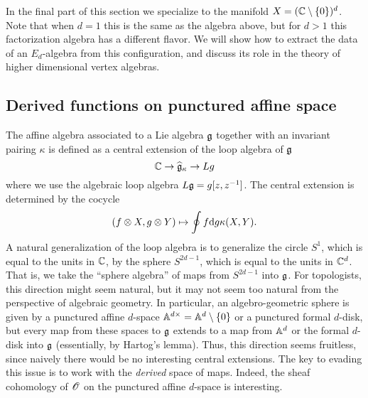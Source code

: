 \documentclass[10pt]{amsart}
\begin{document}
In the final part of this section we specialize to the manifold $X = (\CC \setminus \{0\})^d$. 
Note that when $d=1$ this is the same as the algebra above, but for $d>1$ this factorization algebra has a different flavor. 
We will show how to extract the data of an $E_d$-algebra from this configuration, and discuss its role in the theory of higher dimensional vertex algebras. 



\subsection{Derived functions on punctured affine space}

The affine algebra associated to a Lie algebra $\fg$ together with an invariant pairing $\kappa$ is defined as a central extension of the loop algebra of $\fg$
\[
\CC \to \Hat{\fg}_{\kappa} \to Lg 
\]
where we use the algebraic loop algebra $L\fg = g [z,z^{-1}]$.
The central extension is determined by the cocycle 
\[
(f \tensor X, g \tensor Y) \mapsto \oint f \d g \kappa(X,Y) .
\] 
A natural generalization of the loop algebra is to generalize the circle $S^1$, which is equal to the units in $\CC$, by the sphere $S^{2d-1}$, which is equal to the units in $\CC^d$.
That is, we take the ``sphere algebra'' of maps from $S^{2d-1}$ into $\fg$.
For topologists, this direction might seem natural,
but it may not seem too natural from the perspective of algebraic geometry.
In particular, an algebro-geometric sphere is given by a punctured affine $d$-space $\AA^{d\times} = \AA^d \setminus \{0\}$ or a punctured formal $d$-disk,
but every map from these spaces to $\fg$ extends to a map from $\AA^d$ or the formal $d$-disk into $\fg$ (essentially, by Hartog's lemma).
Thus, this direction seems fruitless, since naively there would be no interesting central extensions.
The key to evading this issue is to work with the {\em derived} space of maps. 
Indeed, the sheaf cohomology of $\sO$ on the punctured affine $d$-space is interesting. 
\end{document}
